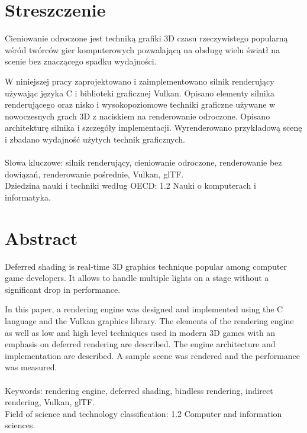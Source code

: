\chapter*{Streszczenie}
Cieniowanie odroczone jest techniką grafiki 3D czasu rzeczywistego popularną wśród twórców gier komputerowych pozwalającą na obsługę wielu światł na scenie bez znaczącego spadku wydajności.

W niniejszej pracy zaprojektowano i zaimplementowano silnik renderujący używając języka C i biblioteki graficznej Vulkan.
Opisano elementy silnika renderującego oraz nisko i wysokopoziomowe techniki graficzne używane w nowoczesnych grach 3D z naciskiem na renderowanie odroczone. Opisano architekturę silnika i szczegóły implementacji. Wyrenderowano przykładową scenę i zbadano wydajność użytych technik graficznych.
\\
\\
Słowa kluczowe: silnik renderujący, cieniowanie odroczone, renderowanie bez dowiązań, renderowanie pośrednie, Vulkan, glTF.
\\
Dziedzina nauki i techniki według OECD: 1.2 Nauki o komputerach i informatyka.

\chapter*{Abstract}

Deferred shading is real-time 3D graphics technique popular among computer game developers. It allows to handle multiple lights on a stage without a significant drop in performance.

In this paper, a rendering engine was designed and implemented using the C language and the Vulkan graphics library.
The elements of the rendering engine as well as low and high level techniques used in modern 3D games with an emphasis on deferred rendering are described.
The engine architecture and implementation are described.
A sample scene was rendered and the performance was measured.
\\
\\
Keywords: rendering engine, deferred shading, bindless rendering, indirect rendering, Vulkan, glTF.
\\
Field of science and technology classification: 1.2 Computer and information sciences.